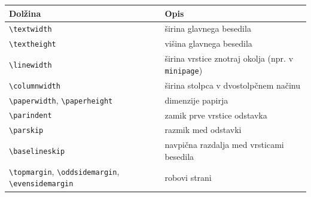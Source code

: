 \bigskip\noindent
\begin{tabular}{p{}p{}}
\toprule
Dolžina & Opis \\
\hline
\texttt{{\textbackslash}textwidth} & širina glavnega besedila \\
\texttt{{\textbackslash}textheight} & višina glavnega besedila \\
\texttt{{\textbackslash}linewidth} & širina vrstice znotraj okolja (npr. v \texttt{minipage}) \\
\texttt{{\textbackslash}columnwidth} & širina stolpca v dvostolpčnem načinu \\
\texttt{{\textbackslash}paperwidth}, \texttt{{\textbackslash}paperheight} & dimenzije papirja \\
\texttt{{\textbackslash}parindent} & zamik prve vrstice odstavka \\
\texttt{{\textbackslash}parskip} & razmik med odstavki \\
\texttt{{\textbackslash}baselineskip} & navpična razdalja med vrsticami besedila \\
\texttt{{\textbackslash}topmargin}, \texttt{{\textbackslash}oddsidemargin}, \texttt{{\textbackslash}evensidemargin} & robovi strani \\
\bottomrule
\end{tabular}

\bigskip
% 
% 
% 
% 
% 
% 
% 
% 
% 
% 
% 
% 

% 
